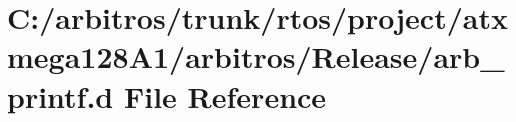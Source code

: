 \hypertarget{rtos_2project_2atxmega128_a1_2arbitros_2_release_2arb__printf_8d}{\section{C\-:/arbitros/trunk/rtos/project/atxmega128\-A1/arbitros/\-Release/arb\-\_\-printf.d File Reference}
\label{rtos_2project_2atxmega128_a1_2arbitros_2_release_2arb__printf_8d}
}
